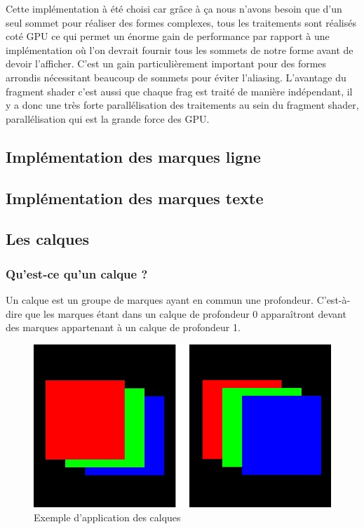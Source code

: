 \documentclass[12pt]{article}
\begin{document}
Cette implémentation à été choisi car grâce à ça nous n'avons besoin que d'un seul sommet pour réaliser des formes complexes, tous les traitements sont réalisés coté GPU ce qui permet un énorme gain de performance par rapport à une implémentation où l'on devrait fournir tous les sommets de notre forme avant de devoir l'afficher. C'est un gain particulièrement important pour des formes arrondis nécessitant beaucoup de sommets pour éviter l'aliasing.
L'avantage du fragment shader c'est aussi que chaque \gls{frag} est traité de manière indépendant, il y a donc une très forte parallélisation des traitements au sein du fragment shader, parallélisation qui est la grande force des GPU. 

\subsection{Implémentation des marques ligne}

\subsection{Implémentation des marques texte}

\subsection{Les calques}
\subsubsection{Qu'est-ce qu'un calque ?}
Un calque est un groupe de marques ayant en commun une profondeur. C'est-à-dire que les marques étant dans
un calque de profondeur 0 apparaîtront devant des marques appartenant à un calque de profondeur 1.

\begin{figure}[htp]
  \centering
  \includegraphics[scale=0.8]{images/calque-exemple}
  \caption{Exemple d'application des calques}
  \label{fig:calque-ex}
\end{figure}
\end{document}
